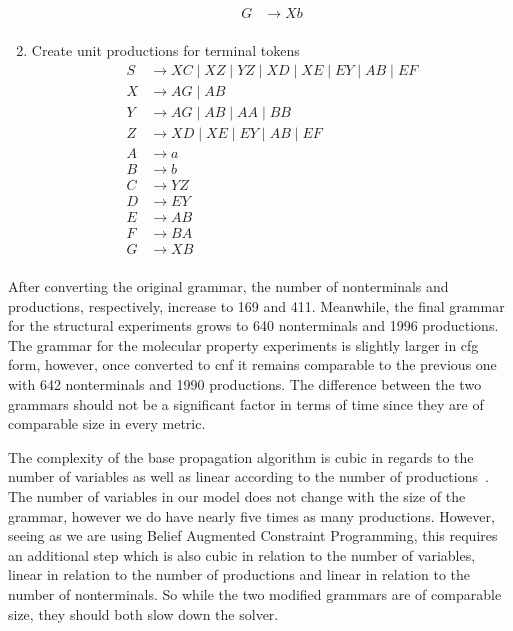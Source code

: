 \documentclass[../Document.tex]{subfiles}
\begin{document}
\begin{enumerate}
\begin{align*}
            G &\rightarrow Xb\\
        \end{align*}
    \item Create unit productions for terminal tokens
        \begin{align*}
            S &\rightarrow XC \mid XZ \mid YZ \mid XD \mid XE \mid EY \mid AB \mid EF\\
            X &\rightarrow AG \mid AB\\
            Y &\rightarrow AG \mid AB \mid AA \mid BB\\
            Z &\rightarrow XD \mid XE \mid EY \mid AB \mid EF\\
            A &\rightarrow a\\
            B &\rightarrow b\\
            C &\rightarrow YZ\\
            D &\rightarrow EY\\
            E &\rightarrow AB\\
            F &\rightarrow BA\\
            G &\rightarrow XB\\
        \end{align*}
\end{enumerate}

After converting the original grammar, the number of nonterminals and productions, respectively, increase to 169 and 411.
Meanwhile, the final grammar for the structural experiments grows to 640 nonterminals and 1996 productions. 
The grammar for the molecular property experiments is slightly larger in \gls{cfg} form, however, once converted to \gls{cnf} it remains comparable to the previous one with 642 nonterminals and 1990 productions. 
The difference between the two grammars should not be a significant factor in terms of time since they are of comparable size in every metric.

The complexity of the base propagation algorithm is cubic in regards to the number of variables as well as linear according to the number of productions~\cite{quimper2006}. The number of variables in our model does not change with the size of the grammar, however we do have nearly five times as many productions.
However, seeing as we are using Belief Augmented Constraint Programming, this requires an additional step which is also cubic in relation to the number of variables, linear in relation to the number of productions and linear in relation to the number of nonterminals.
So while the two modified grammars are of comparable size, they should both slow down the solver.
\end{document}
